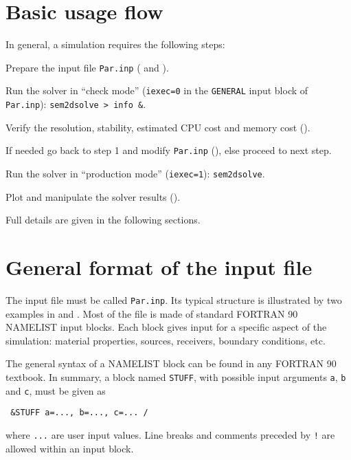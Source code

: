 \section{Basic usage flow}

In general, a simulation requires the following steps:
\begin{senumerate}
  \item Prepare the input file \texttt{Par.inp} ( and ).
  \item Run the solver in ``check mode'' (\texttt{iexec=0} in the \texttt{GENERAL} input block of \texttt{Par.inp}):
        \texttt{sem2dsolve > info \&}.
  \item Verify the resolution, stability, estimated CPU cost and memory cost ().
  \item If needed go back to step 1 and modify \texttt{Par.inp} (), else proceed to next step.
  \item Run the solver in ``production mode'' (\texttt{iexec=1}): \texttt{sem2dsolve}.
  \item Plot and manipulate the solver results ().
\end{senumerate}
Full details are given in the following sections.

\section{General format of the input file}
\label{Sec:input}

The input file must be called \texttt{Par.inp}.
Its typical structure is illustrated by two examples
in  and .
Most of the file is made of standard FORTRAN 90 NAMELIST input blocks.
Each block gives input for a specific aspect of the simulation:
material properties, sources, receivers, boundary conditions, etc.

The general syntax of a NAMELIST block can be found in any FORTRAN 90 textbook.
In summary, a block named \texttt{STUFF}, with possible input arguments 
\texttt{a}, \texttt{b} and \texttt{c}, must be given as
\begin{verbatim}
 &STUFF a=..., b=..., c=... /
\end{verbatim}
where \texttt{...} are user input values. 
Line breaks and comments preceded by \texttt{!} are allowed within an input block.

